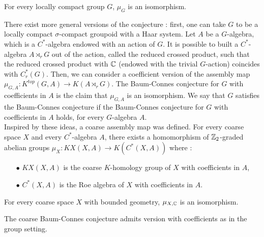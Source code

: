 \begin{conj}
For every locally compact group $G$, $\mu_G$ is an isomorphism.
\end{conj}

There exist more general versions of the conjecture : first, one can take $G$ to be a locally compact $\sigma$-compact groupoid with a Haar system. Let $A$ be a $G$-algebra, which is a $C^*$-algebra endowed with an action of $G$. It is possible to built a $C^*$-algebra $A\rtimes_r G$ out of the action, called the reduced crossed product, such that the reduced crossed product with $\mathbb C$ (endowed with the trivial $G$-action) coincides with $C^*_r(G)$. Then, we can consider a coefficient version of the assembly map $\mu_{G,A} : K^{top}(G,A)\rightarrow K(A\rtimes_r G)$. The Baum-Connes conjecture for $G$ with coefficients in $A$ is the claim that $\mu_{G,A}$ is an isomorphism. We say that $G$ satisfies the Baum-Connes conjecture if the Baum-Connes conjecture for $G$ with coefficients in $A$ holds, for every $G$-algebra $A$.\\

Inspired by these ideas, a coarse assembly map was defined. For every coarse space $X$ and every $C^*$-algebra $A$, there exists a homomorphism of $\mathbb Z_2$-graded abelian groups $\mu_X : KX(X,A)\rightarrow K(C^*(X,A))$ where :\\
\begin{itemize}
\item[$\bullet$] $KX(X,A)$ is the coarse $K$-homology group of $X$ with coefficients in $A$,
\item[$\bullet$] $C^*(X,A)$ is the Roe algebra of $X$ with coefficients in $A$.\\
\end{itemize}

\begin{conj}
For every coarse space $X$ with bounded geometry, $\mu_{X,\mathbb C}$ is an isomorphism.
\end{conj}

The coarse Baum-Connes conjecture admits version with coefficients as in the group setting.\\ 

